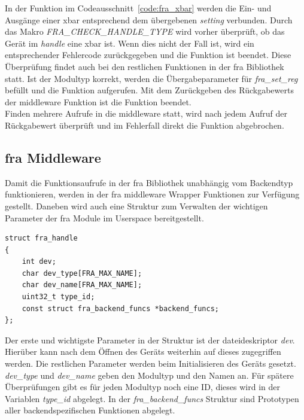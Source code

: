 In der Funktion im Codeausschnitt~\ref{code:fra_xbar} werden die Ein- und Ausgänge einer \ac{xbar} entsprechend dem übergebenen \textit{setting} verbunden.
Durch das Makro \textit{FRA\_CHECK\_HANDLE\_TYPE} wird vorher überprüft, ob das Gerät im \textit{handle} eine \ac{xbar} ist. Wenn dies nicht der Fall ist, wird ein entsprechender Fehlercode zurückgegeben und die Funktion ist beendet. Diese Überprüfung findet auch bei den restlichen Funktionen in der \ac{fra} Bibliothek statt.
Ist der Modultyp korrekt, werden die Übergabeparameter für \textit{fra\_set\_reg} befüllt und die Funktion aufgerufen. Mit dem Zurückgeben des Rückgabewerts der \gls{middleware} Funktion ist die Funktion beendet.\\

Finden mehrere Aufrufe in die \gls{middleware} statt, wird nach jedem Aufruf der Rückgabewert überprüft und im Fehlerfall direkt die Funktion abgebrochen.


\subsection{\acs{fra} Middleware}\label{sec:middleware}
Damit die Funktionsaufrufe in der \ac{fra} Bibliothek unabhängig vom Backendtyp funktionieren, werden in der \ac{fra} \gls{middleware} Wrapper Funktionen zur Verfügung gestellt. Daneben wird auch eine Struktur zum Verwalten der wichtigen Parameter der \ac{fra} Module im Userspace bereitgestellt.


\begin{lstfloat}
\begin{lstlisting}
struct fra_handle
{
	int dev;
	char dev_type[FRA_MAX_NAME];
	char dev_name[FRA_MAX_NAME];
	uint32_t type_id;
	const struct fra_backend_funcs *backend_funcs;
};
\end{lstlisting}
\end{lstfloat}
Der erste und wichtigste Parameter in der Struktur ist der \gls{dateideskriptor} \textit{dev}. Hierüber kann nach dem Öffnen des Geräts weiterhin auf dieses zugegriffen werden. Die restlichen Parameter werden beim Initialisieren des Geräts gesetzt. \textit{dev\_type} und \textit{dev\_name} geben den Modultyp und den Namen an. 
Für spätere Überprüfungen gibt es für jeden Modultyp noch eine ID, dieses wird in der Variablen \textit{type\_id} abgelegt. In der \textit{fra\_backend\_funcs} Struktur sind Prototypen aller backendspezifischen Funktionen abgelegt.\\


